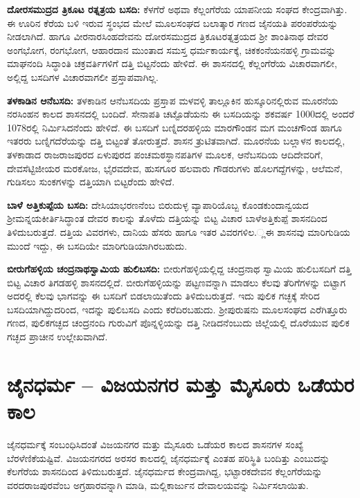 \textbf{ದೋರಸಮುದ್ರದ ತ್ರಿಕೂಟ ರತ್ನತ್ರಯ ಬಸದಿ:} ಕೆಳಗೆರೆ ಅಥವಾ ಕೆಲ್ಲಂಗೆರೆಯ ಯಾಪನೀಯ ಸಂಘದ ಕೇಂದ್ರವಾಗಿತ್ತು. ಈ ಊರಿನ ಕೆರೆಯ ಬಳಿ ಇರುವ ಸ್ಥಂಭದ ಮೇಲೆ ಮೂಲಸಂಘದ ಬಲಾತ್ಕಾರ ಗಣದ ಜೈನಯತಿ ಪರಂಪರೆಯನ್ನು ನೀಡಲಾಗಿದೆ. ಹಾಗೂ ವೀರನಾರಸಿಂಹದೇವನು ದೋರಸಮುದ್ರದ ತ್ರಿಕೂಟರತ್ನತ್ರಯದ ಶ‍್ರೀ ಶಾಂತಿನಾಥ ದೇವರ ಅಂಗಭೋಗ, ರಂಗಭೋಗ, ಆಹಾರದಾನ ಮುಂತಾದ ಸಮಸ್ತ ಧರ್ಮಕಾರ್ಯಕ್ಕೆ, ಚಿಕಕಂನೆಯನಹಳ್ಳಿ ಗ್ರಾಮವನ್ನು ಮಾಘನಂದಿ ಸಿದ್ಧಾಂತಿ ಚಕ್ರವರ್ತಿಗಳಿಗೆ ದತ್ತಿ ಬಿಟ್ಟನೆಂದು ಹೇಳಿದೆ. ಈ ಶಾಸನದಲ್ಲಿ ಕೆಲ್ಲಂಗೆರೆಯ ವಿಚಾರವಾಗಲೀ, ಅಲ್ಲಿದ್ದ ಬಸದಿಗಳ ವಿಚಾರವಾಗಲೀ ಪ್ರಸ್ತಾಪವಾಗಿಲ್ಲ.

\textbf{ತಳಕಾಡಿನ ಆನೆಬಸದಿ:} ತಳಕಾಡಿನ ಆನೆಬಸದಿಯ ಪ್ರಸ್ತಾಪ ಮಳವಳ್ಳಿ ತಾಲ್ಲೂಕಿನ ಹುಸ್ಕೂರಿನಲ್ಲಿರುವ ಮೂರನೆಯ ನರಸಿಂಹನ ಕಾಲದ ಶಾಸನದಲ್ಲಿ ಬಂದಿದೆ. ಸೇನಾಪತಿ ಚಟ್ಟೊಡೆಯನು ಈ ಬಸದಿಯನ್ನು ಶಕವರ್ಷ 1000ದಲ್ಲಿ ಅಂದರೆ 1078ರಲ್ಲಿ ನಿರ್ಮಿಸಿದನೆಂದು ಹೇಳಿದೆ. ಈ ಬಸದಿಗೆ ಬಣ್ನಿದರಹಳ್ಳಿಯ ಮಾರಗೌಂಡನ ಮಗ ಮಂಚಗೌಂಡ ಹಾಗೂ ಇತರರು ಬಣ್ನಿಗದೆರೆಯನ್ನು ದತ್ತಿ ಬಿಟ್ಟಂತೆ ತೋರುತ್ತದೆ. ಶಾಸನ ತ್ರುಟಿತವಾಗಿದೆ. ಮೂರನೆಯ ಬಲ್ಲಾಳನ ಕಾಲದಲ್ಲಿ, ತಳಕಾಡಾದ ರಾಜರಾಜಪುರದ ಏಳುಪುರದ ಪಂಚಮಠಸ್ಥಾನಪತಿಗಳ ಮೂಲಕ, ಆನೆಬಸದಿಯ ಆದಿದೇವರಿಗೆ, ದೇವಸೆಟ್ಟಿಜೀಯರ ಮರಕೋಜ, ಭೈರವದೇವ, ಹುಸಗೂರ ಹಲವಾರು ಗೌಡರುಗಳು ಹೊಲಗದ್ದೆಗಳನ್ನು, ಆಲೆಮನೆ, ಗುಡಿಸಲು ಸುಂಕಗಳನ್ನು ದತ್ತಿಯಾಗಿ ಬಿಟ್ಟರೆಂದು ಹೇಳಿದೆ.

\textbf{ಬಾಳೆ ಅತ್ತಿಕುಪ್ಪೆಯ ಬಸದಿ:} ದೇಸಿಯಾಭರಣನೆಂಬ ಬಿರುದುಳ್ಳ ವ್ಯಾಪಾರಿಯೊಬ್ಬ ಕೊಂಡಕುಂದಾನ್ವಯದ ಶ‍್ರೀಮನ್ನಯಕೀರ್ತಿಸಿದ್ಧಾಂತ ದೇವರ ಕಾಲನ್ನು ತೊಳೆದು ದತ್ತಿಯನ್ನು ಬಿಟ್ಟ ವಿಚಾರ ಬಾಳೆಅತ್ತಿಕುಪ್ಪೆ ಶಾಸನದಿಂದ ತಿಳಿದುಬರುತ್ತದೆ. ದತ್ತಿಯ ವಿವರಗಳು, ದಾನಿಯ ಹೆಸರು ಹಾಗೂ ಇತರ ವಿವರಗಳಿಲ.್ಲಈ ಶಾಸನವು ಮಾರಿಗುಡಿಯ ಮುಂದೆ ಇದ್ದು, ಈ ಬಸದಿಯೇ ಮಾರಿಗುಡಿಯಾಗಿರಬಹುದು.

\textbf{ಬೀರುಗೆಹಳ್ಳಿಯ ಚಂದ್ರನಾಥಸ್ವಾಮಿಯ ಹುಲಿಬಸದಿ:} ಬೀರುಗೆಹಳ್ಳಿಯಲ್ಲಿದ್ದ ಚಂದ್ರನಾಥ ಸ್ವಾಮಿಯ ಹುಲಿಬಸದಿಗೆ ದತ್ತಿ ಬಿಟ್ಟ ವಿಚಾರ ತಿಗಡಹಳ್ಳಿ ಶಾಸನದಲ್ಲಿದೆ. ಬೀರುಗೆಹಳ್ಳಿಯನ್ನು ಪಟ್ಟಣವನ್ನಾಗಿ ಮಾಡಲು ಕೆಲವು ತೆರಿಗೆಗಳನ್ನು ಬಿಟ್ಟಾಗ ಅದರಲ್ಲಿ ಕೆಲವು ಭಾಗವನ್ನು ಈ ಬಸದಿಗೆ ಬಿಡಲಾಯಿತೆಂದು ತಿಳಿದುಬರುತ್ತದೆ. ಇದು ಪುಲಿಕ ಗಚ್ಛಕ್ಕೆ ಸೇರಿದ ಬಸದಿಯಾಗಿದ್ದುದರಿಂದ, ಇದನ್ನು ಪುಲಿಬಸದಿ ಎಂದು ಕರೆದಿರಬಹುದು. ಶ‍್ರೀಪುರುಷನು ಮೂಲಸಂಘದ ಎರೆಗಿತ್ತೂರು ಗಣದ, ಪುಲಿಕಗಚ್ಛದ ಚಂದ್ರನಂದಿ ಗುರುವಿಗೆ ಪೊನ್ನಳ್ಳಿಯನ್ನು ದತ್ತಿ ನೀಡಿದನೆಂಬುದು ಜಿಲ್ಲೆಯಲ್ಲಿ ದೊರೆಯುವ ಪುಲಿಕ ಗಚ್ಛದ ಪ್ರಾಚೀನ ಉಲ್ಲೇಖವಾಗಿದೆ. 


\section{ಜೈನಧರ್ಮ – ವಿಜಯನಗರ ಮತ್ತು ಮೈಸೂರು ಒಡೆಯರ ಕಾಲ}

ಜೈನಧರ್ಮಕ್ಕೆ ಸಂಬಂಧಿಸಿದಂತೆ ವಿಜಯನಗರ ಮತ್ತು ಮೈಸೂರು ಒಡೆಯರ ಕಾಲದ ಶಾಸನಗಳ ಸಂಖ್ಯೆ ಬೆರಳೆಣಿಕೆಯಷ್ಟಿವೆ. ವಿಜಯನಗರದ ಅರಸರ ಕಾಲದಲ್ಲಿ ಜೈನಧರ್ಮಕ್ಕೆ ಎಂತಹ ಪರಿಸ್ಥಿತಿ ಬಂದಿತ್ತು ಎಂಬುದನ್ನು ಕೆಲಗೆರೆಯ ಶಾಸನದಿಂದ ತಿಳಿದುಬರುತ್ತದೆ. ಜೈನಧರ್ಮದ ಕೇಂದ್ರವಾಗಿದ್ದ, ಭಟ್ಟಾರಕದೇವನ ಕೆಲ್ಲಂಗೆರೆಯನ್ನು ವರದರಾಜಪುರವೆಂಬ ಅಗ್ರಹಾರವನ್ನಾಗಿ ಮಾಡಿ, ಮಲ್ಲಿಕಾರ್ಜುನ ದೇವಾಲಯವನ್ನು ನಿರ್ಮಿಸಲಾಯಿತು.


